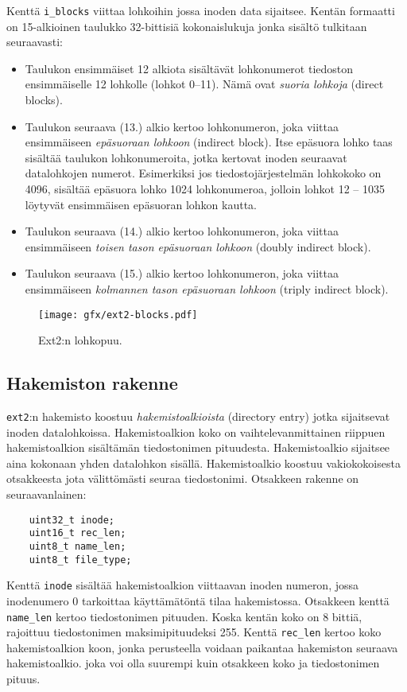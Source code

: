 Kenttä \texttt{i\_blocks} viittaa lohkoihin jossa inoden data sijaitsee.
Kentän formaatti on 15-alkioinen taulukko 32-bittisiä kokonaislukuja jonka sisältö tulkitaan seuraavasti:
\begin{itemize}
    \item Taulukon ensimmäiset 12 alkiota sisältävät lohkonumerot tiedoston ensimmäiselle 12 lohkolle (lohkot 0--11).
          Nämä ovat \emph{suoria lohkoja} (direct blocks).
    \item Taulukon seuraava (13.) alkio kertoo lohkonumeron, joka viittaa ensimmäiseen \emph{epäsuoraan lohkoon} (indirect block).
          Itse epäsuora lohko taas sisältää taulukon lohkonumeroita, jotka kertovat inoden seuraavat datalohkojen numerot.
          Esimerkiksi jos tiedostojärjestelmän lohkokoko on 4096, sisältää epäsuora lohko 1024 lohkonumeroa,
          jolloin lohkot 12 -- 1035 löytyvät ensimmäisen epäsuoran lohkon kautta.
    \item Taulukon seuraava (14.) alkio kertoo lohkonumeron, joka viittaa ensimmäiseen \emph{toisen tason epäsuoraan lohkoon} (doubly indirect block).

    \item Taulukon seuraava (15.) alkio kertoo lohkonumeron, joka viittaa ensimmäiseen \emph{kolmannen tason epäsuoraan lohkoon} (triply indirect block).
\end{itemize}

\begin{figure}
    \label{FigExt2BlockMap}
    \centering
    \texttt{[image: gfx/ext2-blocks.pdf]}
    \caption{Ext2:n lohkopuu.}
\end{figure}

\subsection{Hakemiston rakenne}
\texttt{ext2}:n hakemisto koostuu \emph{hakemistoalkioista} (directory entry) jotka sijaitsevat inoden datalohkoissa.
Hakemistoalkion koko on vaihtelevanmittainen riippuen hakemistoalkion sisältämän tiedostonimen pituudesta.
Hakemistoalkio sijaitsee aina kokonaan yhden datalohkon sisällä.
Hakemistoalkio koostuu vakiokokoisesta otsakkeesta jota välittömästi seuraa tiedostonimi.
Otsakkeen rakenne on seuraavanlainen:

\begin{samepage}
\begin{verbatim}
	uint32_t inode;
	uint16_t rec_len;
	uint8_t name_len;
	uint8_t file_type;
\end{verbatim}
\end{samepage}
%
Kenttä \texttt{inode} sisältää hakemistoalkion viittaavan inoden numeron,
jossa inodenumero 0 tarkoittaa käyttämätöntä tilaa hakemistossa.
Otsakkeen kenttä \texttt{name\_len} kertoo tiedostonimen pituuden.
Koska kentän koko on 8 bittiä, rajoittuu tiedostonimen maksimipituudeksi 255.
Kenttä \texttt{rec\_len} kertoo koko hakemistoalkion koon,
jonka perusteella voidaan paikantaa hakemiston seuraava hakemistoalkio.
joka voi olla suurempi kuin otsakkeen koko ja tiedostonimen pituus.


